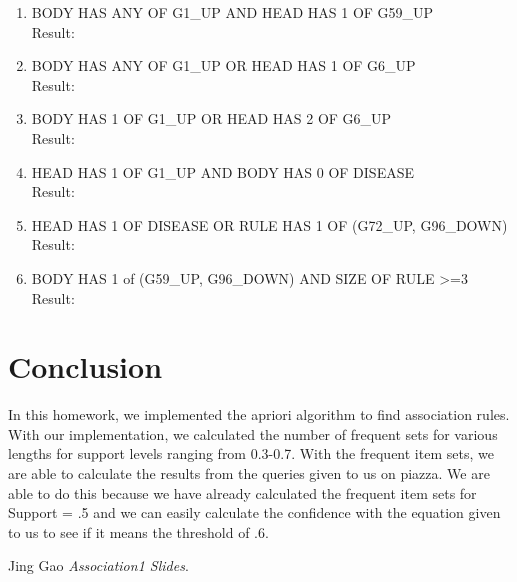 \documentclass[12pt]{article}
\begin{document}
\begin{enumerate}
	\item  BODY HAS ANY OF G1\_UP AND HEAD HAS 1 OF G59\_UP \\
	Result: \\
	\item  BODY HAS ANY OF G1\_UP OR HEAD HAS 1 OF G6\_UP \\
	Result: \\
	\item  BODY HAS 1 OF G1\_UP OR HEAD HAS 2 OF G6\_UP \\
	Result: \\
	\item  HEAD HAS 1 OF G1\_UP AND BODY HAS 0 OF DISEASE \\
	Result: \\
	\item  HEAD HAS 1 OF DISEASE OR RULE HAS 1 OF (G72\_UP, G96\_DOWN) \\
	Result: \\
	\item  BODY HAS 1 of (G59\_UP, G96\_DOWN) AND SIZE OF RULE >=3 \\
	Result: \\
\end{enumerate}
\section*{Conclusion}

In this homework, we implemented the apriori algorithm to find association rules. With our implementation, we calculated the number of frequent sets for various lengths for support levels ranging from 0.3-0.7. With the frequent item sets, we are able to calculate the results from the queries given to us on piazza. We are able to do this because we have already calculated the frequent item sets for Support = .5 and we can easily calculate the confidence with the equation given to us to see if it means the threshold of .6. 






\begin{thebibliography}{9}
	Jing Gao
	\textit{Association1 Slides}. 

\end{thebibliography}
\end{document}
